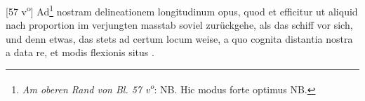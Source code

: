 [57 v\textsuperscript{o}] Ad\footnote{\textit{Am oberen Rand von Bl. 57 v\textsuperscript{o}}: NB. Hic modus forte optimus \Denarius \hspace{3pt}NB.} nostram delineationem longitudinum\protect{} opus, quod et efficitur ut aliquid nach proportion im verjungten masstab soviel zur\"{u}ckgehe, als das schiff\protect{} vor sich, und denn etwas, das stets ad certum locum weise, a quo cognita distantia nostra a data re, et modis flexionis situs .\pend